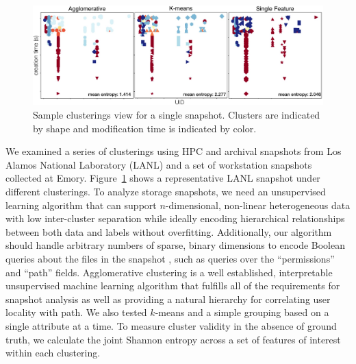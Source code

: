 \begin{figure}
    \centering
    \includegraphics[width=.95\linewidth]{hotstorsnapshot.eps}
    \caption{Sample clusterings view for a single snapshot.  Clusters are indicated by shape and modification time is indicated by color.}
    \label{fig:clusterings}
\end{figure}
We examined a series of clusterings using HPC and archival snapshots from Los Alamos
National Laboratory (LANL) and a set of workstation snapshots collected at Emory.
Figure~\ref{fig:clusterings} shows a representative LANL snapshot under different clusterings.  
To analyze storage snapshots, we need an unsupervised learning algorithm that can support $n$-dimensional, non-linear heterogeneous data with low inter-cluster separation while ideally encoding hierarchical relationships between both data and labels without overfitting.
Additionally, our algorithm should handle arbitrary numbers of sparse, binary
dimensions to encode Boolean queries about the files in the snapshot
, such as queries over the ``permissions'' and ``path'' fields.  
Agglomerative clustering is a well established, interpretable unsupervised
machine learning algorithm that fulfills all of the requirements for snapshot
analysis as well as providing a natural hierarchy for correlating user locality with path.  We also tested $k$-means and a simple grouping based on a single attribute at a time. 
To measure cluster validity in the absence of ground truth, we calculate the joint Shannon entropy across a set of features of
interest within each clustering.



